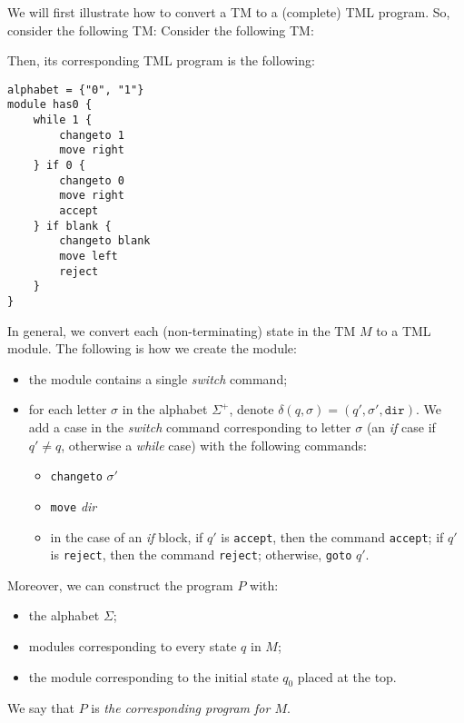 \begin{appendices}
We will first illustrate how to convert a TM to a (complete) TML program. So, consider the following TM:
Consider the following TM:
\begin{figure}[H]
    \centering
\end{figure}
Then, its corresponding TML program is the following:
\begin{lstlisting}[language=TML]
alphabet = {"0", "1"}
module has0 {
    while 1 {
        changeto 1
        move right
    } if 0 {
        changeto 0
        move right
        accept
    } if blank {
        changeto blank
        move left
        reject
    }
}
\end{lstlisting}
In general, we convert each (non-terminating) state in the TM $M$ to a TML module. The following is how we create the module:
\begin{itemize}
    \item the module contains a single \textit{switch} command;
    \item for each letter $\sigma$ in the alphabet $\Sigma^+$, denote $\delta(q, \sigma) = (q', \sigma', \texttt{dir})$. We add a case in the \textit{switch} command corresponding to letter $\sigma$ (an \textit{if} case if $q' \neq q$, otherwise a \textit{while} case) with the following commands:
    \begin{itemize}
        \item \texttt{changeto} $\sigma'$
        \item \texttt{move} \textit{dir}
        \item in the case of an \textit{if} block, if $q'$ is \texttt{accept}, then the command \texttt{accept}; if $q'$ is \texttt{reject}, then the command \texttt{reject}; otherwise, \texttt{goto} $q'$.
    \end{itemize}
\end{itemize}
Moreover, we can construct the program $P$ with:
\begin{itemize}
    \item the alphabet $\Sigma$;
    \item modules corresponding to every state $q$ in $M$;
    \item the module corresponding to the initial state $q_0$ placed at the top.
\end{itemize}
We say that $P$ is \emph{the corresponding program for $M$}.


\end{appendices}
